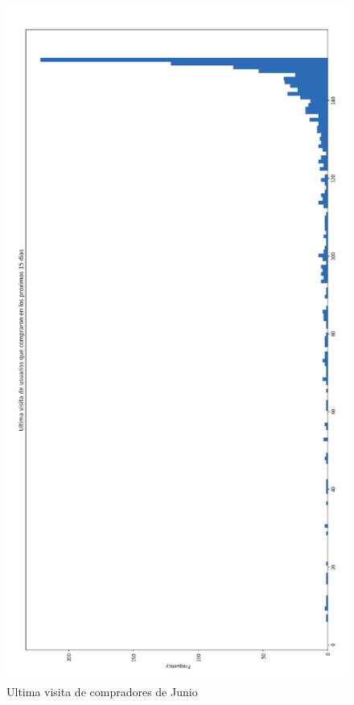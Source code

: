 \documentclass[a4paper ,12pt]{article}
\begin{document}
\begin{figure}[H]
\centering
\includegraphics[width=\linewidth ,  height=0.95\textheight]{ult_vis_prev_com}
\caption{Ultima visita de compradores de Junio}
\label{fig:ult_vis_prev_com}
\end{figure}
\end{document}
